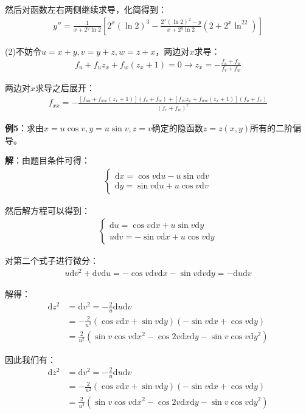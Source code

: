 \documentclass{ctexart}
\let\oldtextbf\textbf %
\renewcommand{\textbf}[1]{\textcolor{btex}{\oldtextbf{#1}}} %
\begin{document}
然后对函数左右两侧继续求导，化简得到：
\begin{align*}
    y''=\frac{1}{x+2^y\ln 2}\left[2^x(\ln 2)^3-\frac{2^x(\ln 2)^2-y}{x+2^y\ln 2}(2+2^x\ln^22)\right]
\end{align*}

(2)不妨令$u=x+y,v=y+z,w=z+x$，两边对$x$求导：
\begin{align*}
    f_u+f_uz_x+f_w(z_x+1)=0\to z_x=-\frac{f_u+f_w}{f_v+f_w}
\end{align*}

两边对$x$求导之后展开：
\begin{align*}
    f_{xx}=-\frac{[f_{uu}+f_{ww}(z_x+1)](f_v+f_w)+[f_{vv}z_x+f_{ww}(z_x+1)](f_u+f_v)}{(f_v+f_w)^2}
\end{align*}

\textbf{例5}：求由$x=u\cos v,y=u\sin v,z=v$确定的隐函数$z=z(x,y)$所有的二阶偏导。

\textbf{解}：由题目条件可得：
\begin{align*}
\begin{cases}
\mathrm{d}x=\cos v\mathrm{d}u-u\sin v\mathrm{d}v\\
\mathrm{d}y=\sin v\mathrm{d}u+u\cos v\mathrm{d}v     
\end{cases}
\end{align*}

然后解方程可以得到：
\begin{align*}
\begin{cases}
\mathrm{d}u=\cos v\mathrm{d}x+u\sin v\mathrm{d}y\\
u\mathrm{d}v=-\sin v\mathrm{d}x+u\cos v\mathrm{d}y     
\end{cases}
\end{align*}

对第二个式子进行微分：
\begin{align*}
u\mathrm{d}v^2+\mathrm{d}v\mathrm{d}u=-\cos v\mathrm{d}v\mathrm{d}x-\sin v\mathrm{d}v\mathrm{d}y
=-\mathrm{d}u\mathrm{d}v   
\end{align*}

解得：
\begin{align*}
\mathrm{d}z^2&=\mathrm{d}v^2=-\frac{2}{u}\mathrm{d}u\mathrm{d}v\\
    &=-\frac{2}{u^2}(\cos v\mathrm{d}x+\sin v\mathrm{d}y)(-\sin v\mathrm{d}x+\cos v\mathrm{d}y)\\
&=\frac{2}{u^2}(\sin v\cos v\mathrm{d}x^2-\cos 2v\mathrm{d}x\mathrm{d}y-\sin v\cos v\mathrm{d}y^2)        
\end{align*}

因此我们有：
\begin{align*}
\mathrm{d}z^2&=\mathrm{d}v^2=-\frac{2}{u}\mathrm{d}u\mathrm{d}v\\
    &=-\frac{2}{u^2}(\cos v\mathrm{d}x+\sin v\mathrm{d}y)(-\sin v\mathrm{d}x+\cos v\mathrm{d}y)\\
&=\frac{2}{u^2}(\sin v\cos v\mathrm{d}x^2-\cos 2v\mathrm{d}x\mathrm{d}y-\sin v\cos v\mathrm{d}y^2)        
\end{align*}
\end{document}
